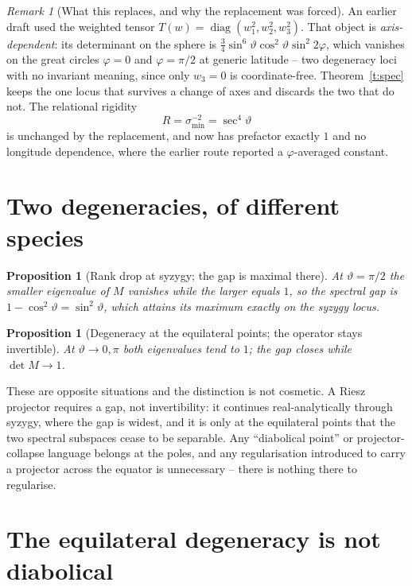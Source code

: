\documentclass[11pt]{article}
\newtheorem{proposition}[theorem]{Proposition}
\theoremstyle{remark}
\newtheorem{remark}[theorem]{Remark}
\begin{document}
\begin{remark}[What this replaces, and why the replacement was forced]
An earlier draft used the weighted tensor $T(w)=\operatorname{diag}(w_1^2,w_2^2,w_3^2)$.
That object is \emph{axis-dependent}: its determinant on the sphere is
$\tfrac34\sin^6\vartheta\cos^2\vartheta\sin^2 2\varphi$, which vanishes on the great circles
$\varphi=0$ and $\varphi=\pi/2$ at generic latitude -- two degeneracy loci with no invariant
meaning, since only $w_3=0$ is coordinate-free. Theorem~\ref{t:spec} keeps the one locus
that survives a change of axes and discards the two that do not. The relational rigidity
\[
R=\sigma_{\min}^{-2}=\sec^{4}\vartheta
\]
is unchanged by the replacement, and now has prefactor exactly $1$ and no longitude
dependence, where the earlier route reported a $\varphi$-averaged constant.
\end{remark}

\section{Two degeneracies, of different species}

\begin{proposition}[Rank drop at syzygy; the gap is maximal there]\label{p:syzygy}
At $\vartheta=\pi/2$ the smaller eigenvalue of $M$ vanishes while the larger equals $1$, so
the spectral gap is $1-\cos^{2}\vartheta=\sin^{2}\vartheta$, which attains its
\emph{maximum} exactly on the syzygy locus.
\end{proposition}

\begin{proposition}[Degeneracy at the equilateral points; the operator stays invertible]
At $\vartheta\to0,\pi$ both eigenvalues tend to $1$; the gap closes while $\det M\to1$.
\end{proposition}

\noindent
These are opposite situations and the distinction is not cosmetic. A Riesz projector
requires a gap, not invertibility: it continues real-analytically through syzygy, where the
gap is widest, and it is only at the equilateral points that the two spectral subspaces
cease to be separable. Any ``diabolical point'' or projector-collapse language belongs at
the poles, and any regularisation introduced to carry a projector across the equator is
unnecessary -- there is nothing there to regularise.

\section{The equilateral degeneracy is not diabolical}
\end{document}
